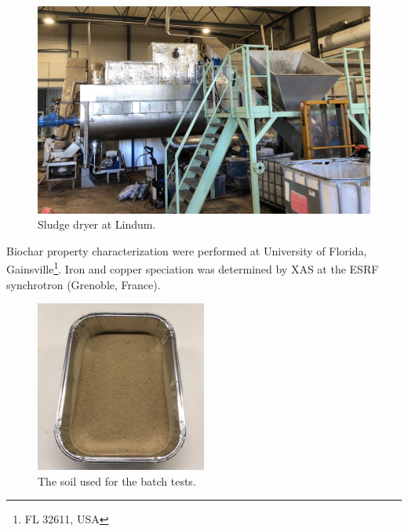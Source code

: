 \begin{figure}
    \centering
    \includegraphics[width=0.7\linewidth,scale=0.7]{Bilder/Pyrolysis/Dryer.jpg}
    \caption{Sludge dryer at Lindum.}
    \label{fig:dryer}
\end{figure}

Biochar property characterization were performed at University of Florida, Gainsville\footnote{FL 32611, USA}. Iron and copper speciation was determined by XAS at the ESRF synchrotron (Grenoble, France).

\begin{figure}
    \centering
    \includegraphics[width=0.5\textwidth]{Bilder/Samples/Soil_blank.JPG}
    \caption{The soil used for the batch tests.}
    \label{fig:soil}
\end{figure}

